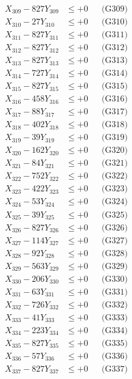 \documentclass[a4paper,10pt]{article}
\begin{document}
{\begin{align}
X_{309} - 827Y_{309} &\leq +0 && \text{(G309)} \\
X_{310} - 27Y_{310} &\leq +0 && \text{(G310)} \\
\allowbreak
X_{311} - 827Y_{311} &\leq +0 && \text{(G311)} \\
X_{312} - 827Y_{312} &\leq +0 && \text{(G312)} \\
X_{313} - 827Y_{313} &\leq +0 && \text{(G313)} \\
X_{314} - 727Y_{314} &\leq +0 && \text{(G314)} \\
X_{315} - 827Y_{315} &\leq +0 && \text{(G315)} \\
X_{316} - 458Y_{316} &\leq +0 && \text{(G316)} \\
X_{317} - 88Y_{317} &\leq +0 && \text{(G317)} \\
X_{318} - 402Y_{318} &\leq +0 && \text{(G318)} \\
X_{319} - 39Y_{319} &\leq +0 && \text{(G319)} \\
X_{320} - 162Y_{320} &\leq +0 && \text{(G320)} \\
\allowbreak
X_{321} - 84Y_{321} &\leq +0 && \text{(G321)} \\
X_{322} - 752Y_{322} &\leq +0 && \text{(G322)} \\
X_{323} - 422Y_{323} &\leq +0 && \text{(G323)} \\
X_{324} - 53Y_{324} &\leq +0 && \text{(G324)} \\
X_{325} - 39Y_{325} &\leq +0 && \text{(G325)} \\
X_{326} - 827Y_{326} &\leq +0 && \text{(G326)} \\
X_{327} - 114Y_{327} &\leq +0 && \text{(G327)} \\
X_{328} - 92Y_{328} &\leq +0 && \text{(G328)} \\
X_{329} - 563Y_{329} &\leq +0 && \text{(G329)} \\
X_{330} - 206Y_{330} &\leq +0 && \text{(G330)} \\
\allowbreak
X_{331} - 63Y_{331} &\leq +0 && \text{(G331)} \\
X_{332} - 726Y_{332} &\leq +0 && \text{(G332)} \\
X_{333} - 41Y_{333} &\leq +0 && \text{(G333)} \\
X_{334} - 223Y_{334} &\leq +0 && \text{(G334)} \\
X_{335} - 827Y_{335} &\leq +0 && \text{(G335)} \\
X_{336} - 57Y_{336} &\leq +0 && \text{(G336)} \\
X_{337} - 827Y_{337} &\leq +0 && \text{(G337)} \\

\end{align}}
\end{document}
